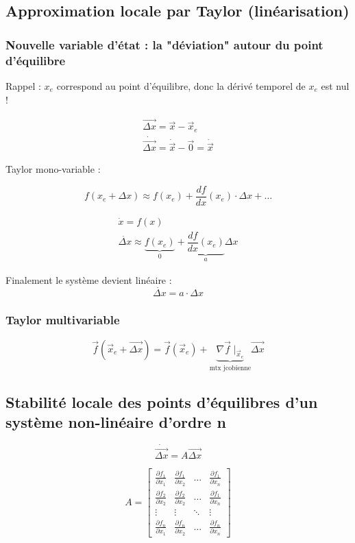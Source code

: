 \documentclass[document.tex]{subfiles}
\begin{document}
\subsection{Approximation locale par Taylor (linéarisation)}



\subsubsection{Nouvelle variable d'état : la "déviation" autour du point d'équilibre}

Rappel : $x_e$ correspond au point d'équilibre, donc la dérivé temporel de $x_e$ est nul !

$$ \begin{array}{l}
 \vec{\Delta x} = \vec{x} - \vec{x}_e \\
 \dot{\vec{\Delta x}} = \dot{\vec{x}} - \vec{0} = \dot{\vec{x}}
\end{array} $$

Taylor mono-variable :

$$ f(x_e + \Delta x) \approx f(x_e) + \dfrac{df}{dx} (x_e)\cdot \Delta x + \ldots $$

$$
\begin{array}{l}
\dot{x} = f(x) \\ \dot{\Delta x} \approx \underbrace{f(x_e)}_{0} + \underbrace{\dfrac{df}{dx} (x_e)}_{a} \Delta x
\end{array}
$$

Finalement le système devient linéaire :
$$ \boxed{\dot{\Delta x}=a\cdot \Delta x} $$

\subsubsection{Taylor multivariable}

$$ \vec{f}(\vec{x}_e + \vec{\Delta x}) = \vec{f}(\vec{x}_e) + \underbrace{\nabla \vec{f} \; \vert_{\vec{x}_e}}_{\text{mtx jcobienne}} \vec{\Delta x}$$

\subsection{Stabilité locale des points d'équilibres d'un système non-linéaire d'ordre n}

$$ \boxed{ \dot{\vec{\Delta x}} = A\vec{\Delta x}} $$

$$ A = \begin{bmatrix}
\frac{\partial f_1}{\partial x_1} & \frac{\partial f_1}{\partial x_2} & \ldots & \frac{\partial f_1}{\partial x_n} \\[6pt]
\frac{\partial f_2}{\partial x_2} & \frac{\partial f_2}{\partial x_2} & \ldots & \frac{\partial f_1}{\partial x_n} \\[6pt]
\vdots & \vdots & \ddots & \vdots \\[6pt] \frac{\partial f_n}{\partial x_1} & \frac{\partial f_n}{\partial x_2} & \ldots & \frac{\partial f_n}{\partial x_n} 
\end{bmatrix} $$
\end{document}
